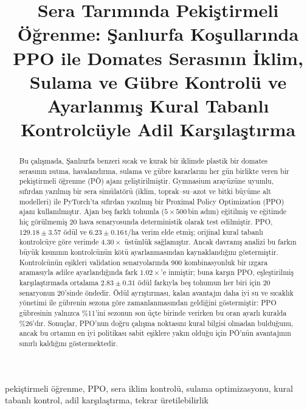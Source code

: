 \documentclass[conference,a4paper]{IEEEtran}
\begin{document}
\title{Sera Tarımında Pekiştirmeli Öğrenme: Şanlıurfa Koşullarında PPO ile Domates Serasının İklim, Sulama ve Gübre Kontrolü ve Ayarlanmış Kural Tabanlı Kontrolcüyle Adil Karşılaştırma}

\author{
}

\maketitle

\begin{abstract}
Bu çalışmada, Şanlıurfa benzeri sıcak ve kurak bir iklimde plastik bir domates serasının ısıtma, havalandırma, sulama ve gübre kararlarını her gün birlikte veren bir pekiştirmeli öğrenme (PÖ) ajanı geliştirilmiştir. Gymnasium arayüzüne uyumlu, sıfırdan yazılmış bir sera simülatörü (iklim, toprak--su--azot ve bitki büyüme alt modelleri) ile PyTorch'ta sıfırdan yazılmış bir Proximal Policy Optimization (PPO) ajanı kullanılmıştır. Ajan beş farklı tohumla ($5\times500$\,bin adım) eğitilmiş ve eğitimde hiç görülmemiş 20 hava senaryosunda deterministik olarak test edilmiştir. PPO, $129.18\pm3.57$ ödül ve $6.23\pm0.16$\,t/ha verim elde etmiş; orijinal kural tabanlı kontrolcüye göre verimde $4.30\times$ üstünlük sağlamıştır. Ancak davranış analizi bu farkın büyük kısmının kontrolcünün kötü ayarlanmasından kaynaklandığını göstermiştir. Kontrolcünün eşikleri validation senaryolarında 900 kombinasyonluk bir ızgara aramasıyla adilce ayarlandığında fark $1.02\times$'e inmiştir; buna karşın PPO, eşleştirilmiş karşılaştırmada ortalama $2.83\pm0.31$ ödül farkıyla beş tohumun her biri için 20 senaryonun 20'sinde öndedir. Ödül ayrıştırması, kalan avantajın daha iyi su ve sıcaklık yönetimi ile gübrenin sezona göre zamanlanmasından geldiğini göstermiştir: PPO gübresinin yalnızca \%11'ini sezonun son üçte birinde verirken bu oran ayarlı kuralda \%26'dır. Sonuçlar, PPO'nun doğru çalışma noktasını kural bilgisi olmadan bulduğunu, ancak bu ortamın en iyi politikası sabit eşiklere yakın olduğu için PÖ'nün avantajının sınırlı kaldığını göstermektedir.
\end{abstract}

\begin{IEEEkeywords}
pekiştirmeli öğrenme, PPO, sera iklim kontrolü, sulama optimizasyonu, kural tabanlı kontrol, adil karşılaştırma, tekrar üretilebilirlik
\end{IEEEkeywords}
\end{document}
